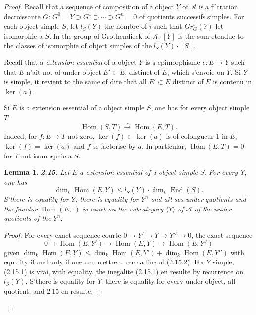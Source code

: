 \documentclass[12pt,a4paper]{article}
\theoremstyle{plain}
\newtheorem{lemma}[theorem]{Lemma}
\theoremstyle{definition}
\theoremstyle{remark}
\DeclareMathOperator{\Hom}{Hom}
\DeclareMathOperator{\End}{End}
\begin{document}
\begin{proof}
Recall that a sequence of composition of a object $Y$ of $\mathcal{A}$ is a filtration decroissante $G$: $G^0 = Y \supset G^1 \supset \cdots \supset G^n = 0$ of quotients successifs simples. For each object simple $S$, let $l_S(Y)$ the nombre of $i$ such that $Gr_G^i(Y)$ let isomorphic a $S$. In the group of Grothendieck of $\mathcal{A}$, $[Y]$ is the sum etendue to the classes of isomorphie of object simples of the $l_S(Y) \cdot [S]$.

Recall that a \emph{extension essential} of a object $Y$ is a epimorphisme $a : E \to Y$ such that $E$ n'ait not of under-object $E' \subset E$, distinct of $E$, which s'envoie on $Y$. Si $Y$ is simple, it revient to the same of dire that all $E' \subset E$ distinct of $E$ is contenu in $\ker(a)$.

Si $E$ is a extension essential of a object simple $S$, one has for every object simple $T$
\[
\Hom(S,T) \xrightarrow{\sim} \Hom(E,T).
\]
Indeed, for $f : E \to T$ not zero, $\ker(f) \subset \ker(a)$ is of colongueur 1 in $E$, $\ker(f) = \ker(a)$ and $f$ se factorise by $a$. In particular, $\Hom(E,T) = 0$ for $T$ not isomorphic a $S$.

\begin{lemma}\label{lem:2.15}
\textbf{2.15.} Let $E$ a extension essential of a object simple $S$. For every $Y$, one has
\begin{equation}\label{eq:2.15.1}
\dim_k \Hom(E,Y) \leq l_S(Y) \cdot \dim_k \End(S).
\end{equation}
S'there is equality for $Y$, there is equality for $Y^n$ and all ses under-quotients and the functor $\Hom(E, \cdot)$ is exact on the subcategory $\langle Y \rangle$ of $\mathcal{A}$ of the under-quotients of the $Y^n$.
\end{lemma}

\begin{proof}
For every exact sequence courte $0 \to Y' \to Y \to Y'' \to 0$, the exact sequence
\begin{equation}\label{eq:2.15.2}
0 \to \Hom(E,Y') \to \Hom(E,Y) \to \Hom(E,Y'')
\end{equation}
given $\dim_k \Hom(E,Y) \leq \dim_k \Hom(E,Y') + \dim_k \Hom(E,Y'')$ with equality if and only if one can mettre a zero a line of (2.15.2). For $Y$ simple, (2.15.1) is vrai, with equality. the inegalite (2.15.1) en resulte by recurrence on $l_S(Y)$. S'there is equality for $Y$, there is equality for every under-object, all quotient, and 2.15 en resulte.
\end{proof}


\end{proof}
\end{document}
